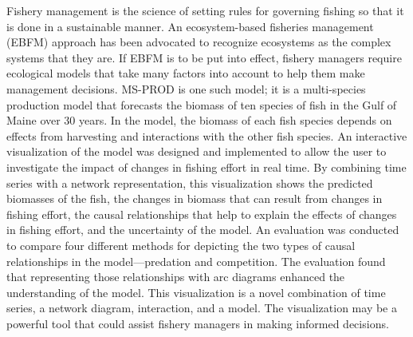 \begin{abstractpage} 

Fishery management is the science of setting rules for governing fishing so that it is done in a sustainable manner.  An ecosystem-based fisheries management (EBFM) approach has been advocated to recognize ecosystems as the complex systems that they are.  If EBFM is to be put into effect, fishery managers require ecological models that take many factors into account to help them make management decisions. MS-PROD is one such model; it is a multi-species production model that forecasts the biomass of ten species of fish in the Gulf of Maine over 30 years.  In the model, the biomass of each fish species depends on effects from harvesting and interactions with the other fish species.  An interactive visualization of the model was designed and implemented to allow the user to investigate the impact of changes in fishing effort in real time.  By combining time series with a network representation, this visualization shows the predicted biomasses of the fish, the changes in biomass that can result from changes in fishing effort, the causal relationships that help to explain the effects of changes in fishing effort, and the uncertainty of the model.  An evaluation was conducted to compare four different methods for depicting the two types of causal relationships in the model---predation and competition.  The evaluation found that representing those relationships with arc diagrams enhanced the understanding of the model.  This visualization is a novel combination of time series, a network diagram, interaction, and a model. The visualization may be a powerful tool that could assist fishery managers in making informed decisions.

\end{abstractpage}